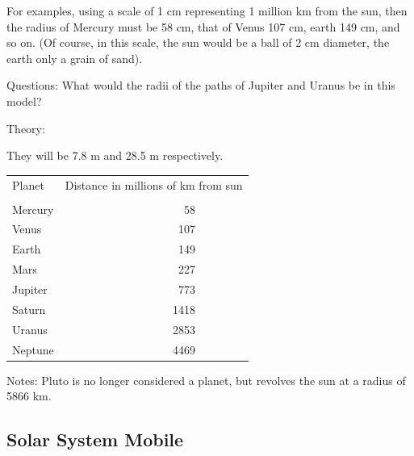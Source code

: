 \begin{multicols}{2}
\begin{description*}
{For examples, using a scale of 1 cm representing 1 million km from the sun, then the radius of Mercury must be 58 cm, that of Venus 107 cm, earth 149 cm, and so on. (Of course, in this scale, the sun would be a ball of 2 cm diameter, the earth only a grain of sand).}
\item[Questions:]{What would the radii of the paths of Jupiter and Uranus be in this model?}
\item[Theory:]{They will be 7.8 m and 28.5 m respectively.
\begin{center}
\begin{tabular}{l r r}
\multicolumn{1}{l}{Planet} & \multicolumn{2}{p{0.2\textwidth}}{Distance in millions of km from sun}\\
&\\
Mercury & 58&\\
Venus & 107&\\
Earth & 149&\\
Mars & 227&\\
Jupiter & 773&\\
Saturn & 1418&\\
Uranus & 2853&\\
Neptune & 4469&
\end{tabular}
\end{center}}
\item[Notes:]{Pluto is no longer considered a planet, but revolves the sun at a radius of 5866 km.}
\end{description*}

\columnbreak

\subsection{Solar System Mobile}



\end{multicols}
